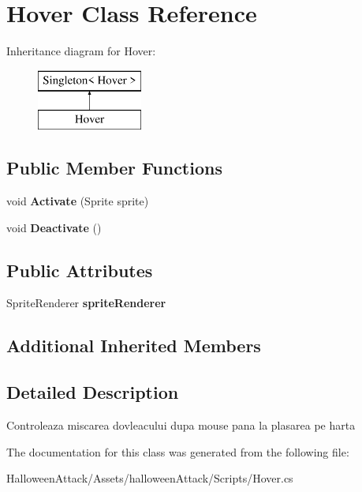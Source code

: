 \hypertarget{class_hover}{}\section{Hover Class Reference}
\label{class_hover}
Inheritance diagram for Hover\+:\begin{figure}[H]
\begin{center}
\leavevmode
\includegraphics[height=2.000000cm]{class_hover}
\end{center}
\end{figure}
\subsection*{Public Member Functions}
\begin{DoxyCompactItemize}
\item 
\mbox{\label{class_hover_a04c0b6d29a85d5f8ae51eaba6fc11cd0}} 
void {\bfseries Activate} (Sprite sprite)
\item 
\mbox{\label{class_hover_aae6c1f16666c7574857cf6d74c700bbb}} 
void {\bfseries Deactivate} ()
\end{DoxyCompactItemize}
\subsection*{Public Attributes}
\begin{DoxyCompactItemize}
\item 
\mbox{\label{class_hover_a38509a892cf15f821d95403bfce8a7dc}} 
Sprite\+Renderer {\bfseries sprite\+Renderer}
\end{DoxyCompactItemize}
\subsection*{Additional Inherited Members}


\subsection{Detailed Description}
Controleaza miscarea dovleacului dupa mouse pana la plasarea pe harta 

The documentation for this class was generated from the following file\+:\begin{DoxyCompactItemize}
\item 
Halloween\+Attack/\+Assets/halloween\+Attack/\+Scripts/Hover.\+cs\end{DoxyCompactItemize}
